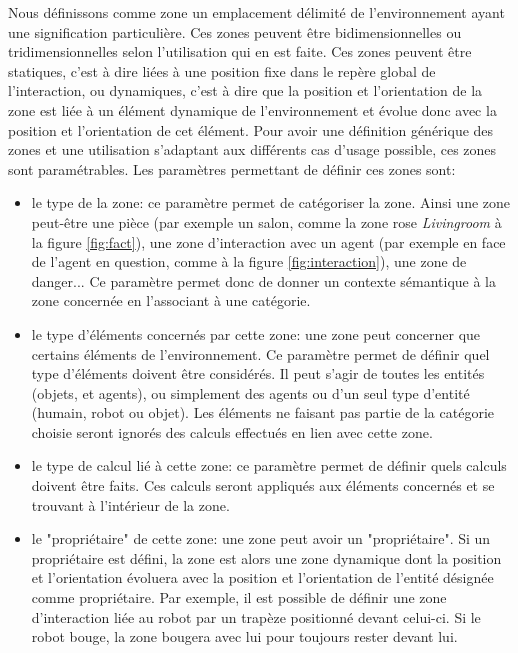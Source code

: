 \documentclass[a4paper,11pt,twoside]{StyleThese}
\begin{document}
Nous définissons comme zone un emplacement délimité de l'environnement ayant une signification particulière. Ces zones peuvent être bidimensionnelles ou tridimensionnelles selon l'utilisation qui en est faite. Ces zones peuvent être statiques, c'est à dire liées à une position fixe dans le repère global de l'interaction, ou dynamiques, c'est à dire que la position et l'orientation de la zone est liée à un élément dynamique de l'environnement et évolue donc avec la position et l'orientation de cet élément. Pour avoir une définition générique des zones et une utilisation s'adaptant aux différents cas d'usage possible, ces zones sont paramétrables. Les paramètres permettant de définir ces zones sont:
\begin{itemize}
\item le type de la zone: ce paramètre permet de catégoriser la zone. Ainsi une zone peut-être une pièce (par exemple un salon, comme la zone rose \textit{Livingroom} à la figure \ref{fig:fact}), une zone d'interaction avec un agent (par exemple en face de l'agent en question, comme à la figure \ref{fig:interaction}), une zone de danger...
Ce paramètre permet donc de donner un contexte sémantique à la zone concernée en l'associant à une catégorie.
\item le type d'éléments concernés par cette zone: une zone peut concerner que certains éléments de l'environnement. Ce paramètre permet de définir quel type d'éléments doivent être considérés. Il peut s'agir de toutes les entités (objets, et agents), ou simplement des agents ou d'un seul type d'entité (humain, robot ou objet). Les éléments ne faisant pas partie de la catégorie choisie seront ignorés des calculs effectués en lien avec cette zone.
\item le type de calcul lié à cette zone: ce paramètre permet de définir quels calculs doivent être faits. Ces calculs seront appliqués aux éléments concernés et se trouvant à l'intérieur de la zone.
\item le "propriétaire" de cette zone: une zone peut avoir un "propriétaire". Si un propriétaire est défini, la zone est alors une zone dynamique dont la position et l'orientation évoluera avec la position et l'orientation de l'entité désignée comme propriétaire. Par exemple, il est possible de définir une zone d'interaction liée au robot par un trapèze positionné devant celui-ci. Si le robot bouge, la zone bougera avec lui pour toujours rester devant lui.
\end{itemize}
\end{document}
